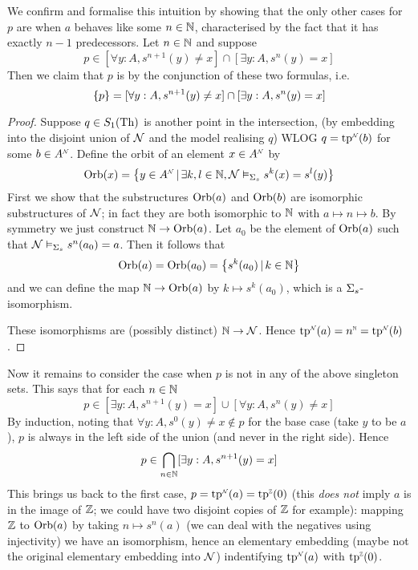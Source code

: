 \begin{eg}
    We confirm and formalise this intuition by showing that the only other 
    cases for $p$ are when $a$ behaves like some $n \in \mathbb{N}$, 
    characterised by the fact that it has exactly $n - 1$ predecessors.
    Let $n \in \mathbb{N}$ and suppose 
    \[
        p \in 
        [\forall y : A, s^{n+1}(y) \ne x] \cap [\exists y : A, s^{n}(y) = x]
    \]
    Then we claim that $p$ is  by 
    the conjunction of these two formulas, i.e.
    \[
        \left\{p\right\} = 
        [\forall y : A, s^{n+1}(y) \ne x] \cap [\exists y : A, s^{n}(y) = x]
    \]
    \begin{proof}
        Suppose $q \in S_1(\mathrm{Th})$ is another point in the intersection, 
        (by embedding into the disjoint union of 
        $\mathcal{N}$ and the model realising $q$)
        WLOG $q = \nnintp{\tp}(b)$ for some $b \in \nnintp{A}$.
        Define the orbit of an element $x \in \nnintp{A}$ by 
        \[
            \Orb(x) = \set{y \in \nnintp{A} \st \exists k, l \in \N, 
            \NN \model{\Si_s} s^k(x) = s^l(y)}
        \]
        First we show that the substructures $\operatorname{Orb}(a)$ and 
        $\operatorname{Orb}(b)$ are isomorphic 
        substructures of $\mathcal{N}$; in fact they are both isomorphic to $\mathbb{N}$
        with $a \mapsto n \mapsto b$.
        By symmetry we just construct $\mathbb{N} \to \operatorname{Orb}(a)$.
        Let $a_0$ be the element of $\operatorname{Orb}(a)$ such that 
        $\mathcal{N} \vDash_{\Sigma_s} s^n(a_0) = a$. Then it follows that 
        \[\operatorname{Orb}(a) = \operatorname{Orb}(a_0) = \left\{s^k(a_0) \,|\, k \in \mathbb{N}\right\}\]
        and we can define the map $\mathbb{N} \to \operatorname{Orb}(a)$ by $k \mapsto s^k(a_0)$,
        which is a $\Sigma_s$-isomorphism.

        These isomorphisms are (possibly distinct) 
         $\mathbb{N} \to \mathcal{N}$.
        Hence $\nnintp{\tp}(a) = \modintp{\N}{n} = \nnintp{\tp}(b)$.
    \end{proof}
    Now it remains to consider the case when $p$ is not in any of 
    the above singleton sets.
    This says that for each $n \in \mathbb{N}$ 
    \[
        p \in [\exists y : A, s^{n+1}(y) = x] 
        \cup [\forall y : A, s^{n}(y) \ne x]
    \]
    By induction, noting that $\forall y : A, s^{0}(y) \ne x \notin p$ for the 
    base case (take $y$ to be $a$), $p$ is always in the left side of the 
    union (and never in the right side).
    Hence 
    \[
        p \in \bigcap_{n \in \mathbb{N}} [\exists y : A, s^{n+1}(y) = x]
    \]
    This brings us back to the first case, 
    $p = \nnintp{\tp}(a) = \modintp{\Z}{\tp}(0)$
    (this \textit{does not} imply $a$ is in the image of $\mathbb{Z}$;
    we could have two disjoint copies of $\mathbb{Z}$ for example):
    mapping $\mathbb{Z}$ to $\operatorname{Orb}(a)$ by taking $n \mapsto s^n(a)$ 
    (we can deal with the negatives using injectivity) 
    we have an isomorphism, hence an elementary embedding 
    (maybe not the original elementary embedding into $\mathcal{N}$)
    indentifying $\nnintp{\tp}(a)$ with $\modintp{\Z}{\tp}(0)$.
\end{eg}

